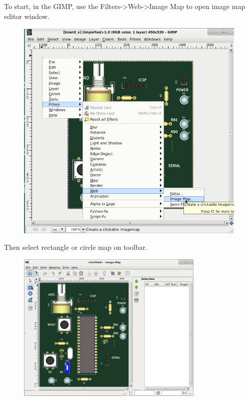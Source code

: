 To start, in the GIMP, use the Filters->Web->Image Map to open image map editor window.
\begin{figure}[H]
\center
\includegraphics[width=0.99\textwidth]{img/hb/gimp01.png} 
\end{figure} 

\pagebreak
Then select rectangle or circle map on toolbar.
\begin{figure}[H]
\center
\includegraphics[width=0.8\textwidth]{img/hb/gimp02.png} 
\end{figure} 

